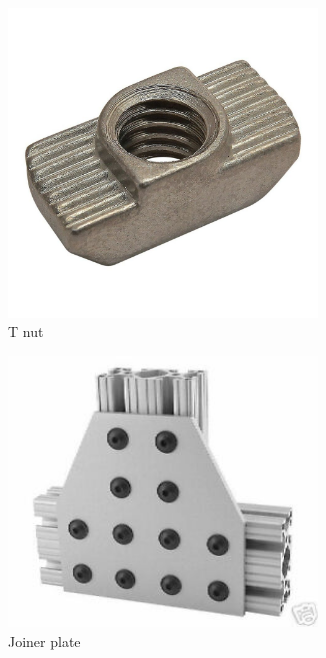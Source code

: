 	\begin{figure}[H]
	\begin{subfigure}[b]{.32\linewidth}
		\includegraphics[width=0.9\textwidth]{imgs/tradition_8020_tnut.jpeg}
		\caption{T nut}
	\end{subfigure}\begin{subfigure}[b]{.32\linewidth}
		\includegraphics[width=0.9\textwidth]{imgs/tradition_8020_ext_plate.jpeg}
		\caption{Joiner plate}
	\end{subfigure}\begin{subfigure}[b]{.32\linewidth}

\end{subfigure}
\end{figure}
